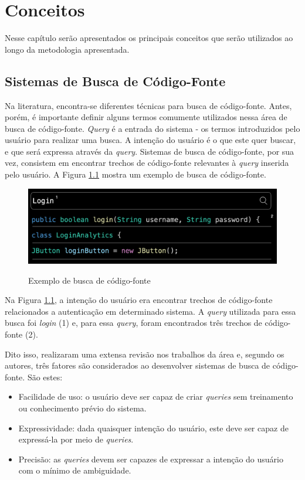 \chapter{Conceitos}
\label{chp:concepts}
Nesse capítulo serão apresentados os principais conceitos que serão utilizados ao longo da metodologia apresentada.

\section{Sistemas de Busca de Código-Fonte}
Na literatura, encontra-se diferentes técnicas para busca de código-fonte. Antes, porém, é importante definir alguns termos comumente utilizados nessa área de busca de código-fonte. \textit{Query} é a entrada do sistema - os termos introduzidos pelo usuário para realizar uma busca. A intenção do usuário é o que este quer buscar, e que será expressa através da \textit{query}. Sistemas de busca de código-fonte, por sua vez, consistem em encontrar trechos de código-fonte relevantes à \textit{query} inserida pelo usuário. A Figura \ref{fig:concepts:code-search-structure} mostra um exemplo de busca de código-fonte.

\begin{figure}[H]
    \centering
    \caption{Exemplo de busca de código-fonte}
    \includegraphics[width=\textwidth,keepaspectratio=true]{imagens/conceitos/code-search-structure.png}
    \label{fig:concepts:code-search-structure}
\end{figure}

Na Figura \ref{fig:concepts:code-search-structure}, a intenção do usuário era encontrar trechos de código-fonte relacionados a autenticação em determinado sistema. A \textit{query} utilizada para essa busca foi \textit{login} (1) e, para essa \textit{query}, foram encontrados três trechos de código-fonte (2).

Dito isso, \textcite{Grazia2022CodeSA} realizaram uma extensa revisão nos trabalhos da área e, segundo os autores, três fatores são considerados ao desenvolver sistemas de busca de código-fonte. São estes:
\begin{itemize}
  \item Facilidade de uso: o usuário deve ser capaz de criar \textit{queries} sem treinamento ou conhecimento prévio do sistema.
  \item Expressividade: dada quaisquer intenção do usuário, este deve ser capaz de expressá-la por meio de \textit{queries}.
  \item Precisão: as \textit{queries} devem ser capazes de expressar a intenção do usuário com o mínimo de ambiguidade.
\end{itemize}

